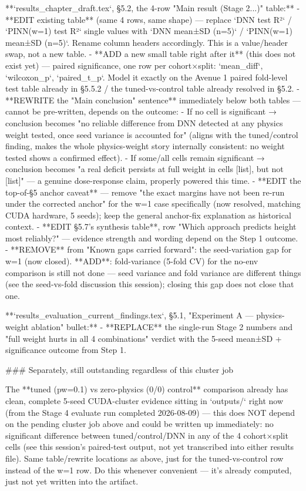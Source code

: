 **`results_chapter_draft.tex`, §5.2, the 4-row "Main result (Stage 2...)" table:**
- **EDIT existing table** (same 4 rows, same shape) — replace `DNN test R²` / `PINN(w=1) test R²` single
  values with `DNN mean±SD (n=5)` / `PINN(w=1) mean±SD (n=5)`. Rename column headers accordingly.
  This is a value/header swap, not a new table.
- **ADD a new small table right after it** (this does not exist yet) — paired significance, one row
  per cohort×split: `mean_diff`, `wilcoxon_p`, `paired_t_p`. Model it exactly on the Avenue 1 paired
  fold-level test table already in §5.5.2 / the tuned-vs-control table already resolved in §5.2.
- **REWRITE the "Main conclusion" sentence** immediately below both tables — cannot be pre-written,
  depends on the outcome:
  - If no cell is significant → conclusion becomes "no reliable difference from DNN detected at any
    physics weight tested, once seed variance is accounted for" (aligns with the tuned/control finding,
    makes the whole physics-weight story internally consistent: no weight tested shows a confirmed effect).
  - If some/all cells remain significant → conclusion becomes "a real deficit persists at full weight
    in cells [list], but not [list]" — a genuine dose-response claim, properly powered this time.
- **EDIT the top-of-§5 anchor caveat** — remove "the exact margins have not been re-run under the
  corrected anchor" for the w=1 case specifically (now resolved, matching CUDA hardware, 5 seeds);
  keep the general anchor-fix explanation as historical context.
- **EDIT §5.7's synthesis table**, row "Which approach predicts height most reliably?" — evidence
  strength and wording depend on the Step 1 outcome.
- **REMOVE** from "Known gaps carried forward": the seed-variation gap for w=1 (now closed). **ADD**:
  fold-variance (5-fold CV) for the no-env comparison is still not done — seed variance and fold
  variance are different things (see the seed-vs-fold discussion this session); closing this gap
  does not close that one.

**`results_evaluation_current_findings.tex`, §5.1, "Experiment A — physics-weight ablation" bullet:**
- **REPLACE** the single-run Stage 2 numbers and "full weight hurts in all 4 combinations" verdict
  with the 5-seed mean±SD + significance outcome from Step 1.

### Separately, still outstanding regardless of this cluster job

The **tuned (pw=0.1) vs zero-physics (0/0) control** comparison already has clean, complete 5-seed
CUDA-cluster evidence sitting in `outputs/` right now (from the Stage 4 evaluate run completed
2026-08-09) — this does NOT depend on the pending cluster job above and could be written up
immediately: no significant difference between tuned/control/DNN in any of the 4 cohort×split
cells (see this session's paired-test output, not yet transcribed into either results file).
Same table/rewrite locations as above, just for the tuned-vs-control row instead of the w=1 row.
Do this whenever convenient — it's already computed, just not yet written into the artifact.
